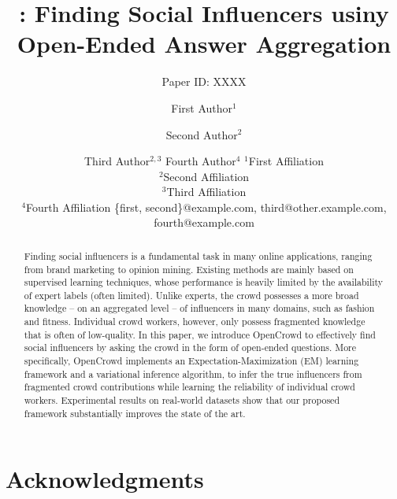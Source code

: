 \documentclass{article}
\title{\sys: Finding Social Influencers usiny Open-Ended Answer Aggregation}
\author{
Paper ID: XXXX
}
\author{
First Author$^1$
\and
Second Author$^2$\and
Third Author$^{2,3}$\And
Fourth Author$^4$
\affiliations
$^1$First Affiliation\\
$^2$Second Affiliation\\
$^3$Third Affiliation\\
$^4$Fourth Affiliation
\emails
\{first, second\}@example.com,
third@other.example.com,
fourth@example.com
}
\newcommand{\sys}{OpenCrowd\xspace}
\begin{document}
\maketitle

\begin{abstract}
Finding social influencers is a fundamental task in many online applications, ranging from brand
marketing to opinion mining. Existing methods are mainly based on supervised learning techniques,
whose performance is heavily limited by the availability of expert labels (often limited). Unlike
experts, the crowd possesses a more broad knowledge -- on an aggregated level -- of
influencers in many domains, such as fashion and fitness. Individual crowd workers, however, only
possess fragmented knowledge that is often of low-quality. In this paper, we introduce \sys to
effectively find social influencers by asking the crowd in the form of open-ended questions. More
specifically, \sys implements an Expectation-Maximization (EM) learning framework and a variational
inference algorithm,  to infer the true influencers from fragmented crowd
contributions while learning the reliability of individual crowd workers. Experimental results on
real-world datasets show that our proposed framework substantially improves the state of the art.
\end{abstract}





\label{sec:intro}


\label{sec:related}


\label{sec:method}


\label{sec:result}


\label{sec:conclusion}




\section*{Acknowledgments}





\end{document}
